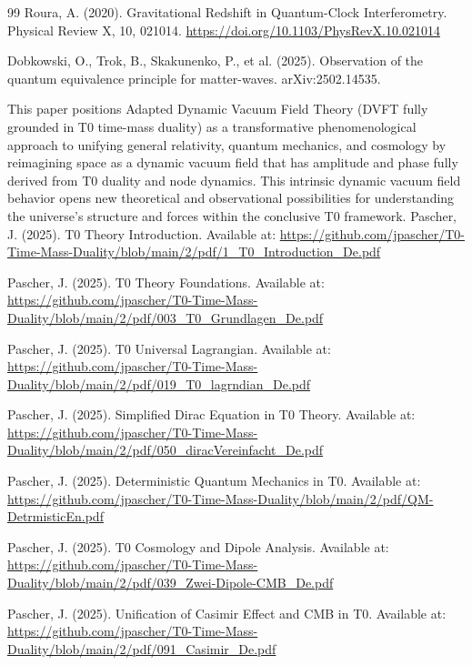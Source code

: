 \documentclass[12pt,a4paper]{article}
\begin{document}
\begin{thebibliography}{99}
		Roura, A. (2020). Gravitational Redshift in Quantum-Clock Interferometry. Physical Review X, 10, 021014. \url{https://doi.org/10.1103/PhysRevX.10.021014}
		
		Dobkowski, O., Trok, B., Skakunenko, P., et al. (2025). Observation of the quantum equivalence principle for matter-waves. arXiv:2502.14535.
		
		This paper positions Adapted Dynamic Vacuum Field Theory (DVFT fully grounded in T0 time-mass duality) as a transformative phenomenological approach to unifying general relativity, quantum mechanics, and cosmology by reimagining space as a dynamic vacuum field that has amplitude and phase fully derived from T0 duality and node dynamics. This intrinsic dynamic vacuum field behavior opens new theoretical and observational possibilities for understanding the universe’s structure and forces within the conclusive T0 framework.
		Pascher, J. (2025). T0 Theory Introduction. Available at: \url{https://github.com/jpascher/T0-Time-Mass-Duality/blob/main/2/pdf/1_T0_Introduction_De.pdf}
		
		Pascher, J. (2025). T0 Theory Foundations. Available at: \url{https://github.com/jpascher/T0-Time-Mass-Duality/blob/main/2/pdf/003_T0_Grundlagen_De.pdf}
		
		Pascher, J. (2025). T0 Universal Lagrangian. Available at: \url{https://github.com/jpascher/T0-Time-Mass-Duality/blob/main/2/pdf/019_T0_lagrndian_De.pdf}
		
		Pascher, J. (2025). Simplified Dirac Equation in T0 Theory. Available at: \url{https://github.com/jpascher/T0-Time-Mass-Duality/blob/main/2/pdf/050_diracVereinfacht_De.pdf}
		
		Pascher, J. (2025). Deterministic Quantum Mechanics in T0. Available at: \url{https://github.com/jpascher/T0-Time-Mass-Duality/blob/main/2/pdf/QM-DetrmisticEn.pdf}
		
		Pascher, J. (2025). T0 Cosmology and Dipole Analysis. Available at: \url{https://github.com/jpascher/T0-Time-Mass-Duality/blob/main/2/pdf/039_Zwei-Dipole-CMB_De.pdf}
		
		Pascher, J. (2025). Unification of Casimir Effect and CMB in T0. Available at: \url{https://github.com/jpascher/T0-Time-Mass-Duality/blob/main/2/pdf/091_Casimir_De.pdf}
		

\end{thebibliography}
\end{document}
